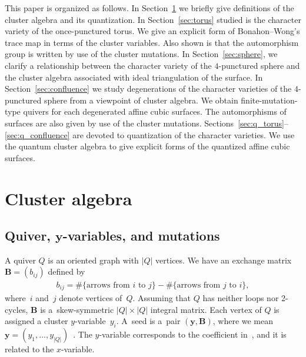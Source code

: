 \documentclass[pdftex]{sigma}
\numberwithin{equation}{section}
\begin{document}
This paper is organized as follows. In Section~\ref{sec:cluster} we briefly give definitions of the cluster algebra and its quantization. In Section~\ref{sec:torus} studied is the character variety of the once-punctured torus. We give an explicit form of Bonahon--Wong's trace map in terms of the cluster variables. Also shown is that the automorphism group is written by use of the cluster mutations. In Section~\ref{sec:sphere}, we clarify a relationship between the character variety of the $4$-punctured sphere and the cluster algebra associated with ideal triangulation of the surface. In Section~\ref{sec:confluence} we study degenerations of the character varieties of the $4$-punctured sphere from a viewpoint of cluster algebra. We obtain finite-mutation-type quivers for each degenerated affine cubic surfaces. The automorphisms of surfaces are also given by use of the cluster mutations. Sections~\ref{sec:q_torus}--\ref{sec:q_confluence} are devoted to quantization of the character varieties. We use the quantum cluster algebra to give explicit forms of the quantized affine cubic surfaces.

\section{Cluster algebra} \label{sec:cluster}
\subsection[Quiver, $y$-variables, and mutations]{Quiver, $\boldsymbol{y}$-variables, and mutations}
A quiver $Q$ is an oriented graph with $|Q|$ vertices. We have an exchange matrix $\mathbf{B} = (b_{ij})$ defined by
\begin{gather*}
 b_{ij}= \#\{ \text{arrows from $i$ to $j$}\} - \# \{ \text{arrows from $j$ to $i$} \} ,
\end{gather*}
where~$i$ and~$j$ denote vertices of~$Q$. Assuming that $Q$ has neither loops nor 2-cycles, $\mathbf{B}$ is a~skew-symmetric $|Q|\times |Q|$ integral matrix. Each vertex of $Q$ is assigned a cluster $y$-variable~$y_i$. A~seed is a~pair $(\boldsymbol{y}, \mathbf{B})$, where we mean $\boldsymbol{y}=(y_1, \dots, y_{|Q|})$~\cite{FominZelev02a}. The $y$-variable corresponds to the coefficient in~\cite{FominZelev02a}, and it is related to the $x$-variable.
\end{document}
